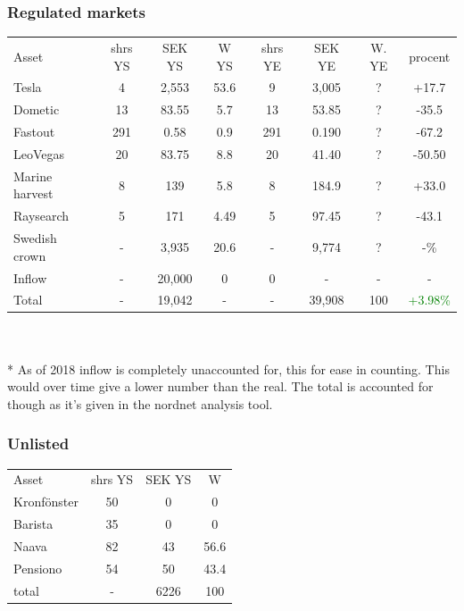 \documentclass[a4paper]{article}
\begin{document}
\subsubsection{Regulated markets}
    
\begin{tabular}{l|c|c|c|c|c|c|c}
	Asset & shrs YS & SEK YS & W YS& shrs YE & SEK YE & W. YE & procent \\
    Tesla & 4 & 2,553 & 53.6 & 9 & 3,005 & ? & +17.7 \\
    Dometic & 13 & 83.55 & 5.7 & 13 & 53.85 & ? & -35.5 \\
    Fastout & 291 & 0.58 & 0.9 & 291 & 0.190 & ? & -67.2 \\
    LeoVegas & 20 & 83.75 & 8.8 & 20 & 41.40 & ? & -50.50 \\
    Marine harvest & 8 & 139 & 5.8 & 8 & 184.9 & ? & +33.0\\
    Raysearch & 5 & 171 & 4.49 & 5 & 97.45 & ? & -43.1\\

    Swedish crown & - & 3,935 & 20.6 & - & 9,774 & ? & -\% \\
    Inflow & - & 20,000 & 0 & 0 & - & - & - \\ 
    Total & - & 19,042 & - & - & 39,908 & 100 & \textcolor{green}{+3.98\%}
    \end{tabular} \\
\\

* As of 2018 inflow is completely unaccounted for, this for ease in counting. This would over time give a lower number than the real. The total is accounted for though as it's given in the nordnet analysis tool.

\subsubsection{Unlisted}
\begin{tabular}{l|c|c|c}
	Asset & shrs YS & SEK YS & W \\
    Kronfönster & 50 & 0 & 0 \\ 
    Barista & 35 & 0 & 0 \\
    Naava & 82 & 43 & 56.6 \\ %
    Pensiono & 54 & 50 & 43.4\\ %
    
    total & - & 6226 & 100
    \end{tabular} \\
\\
\end{document}

